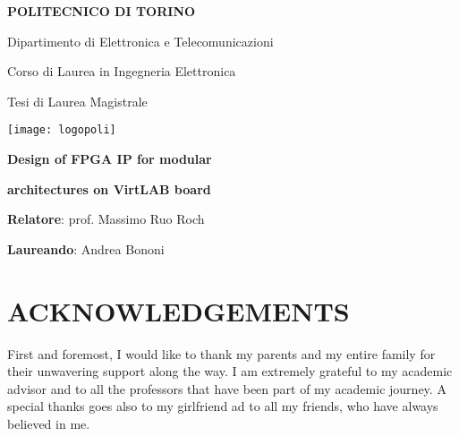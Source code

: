 \documentclass[10pt, english, a4paper, titlepage, oneside]{book}
\begin{document}
 

\begin{titlepage}
    \centerline{ \Huge\bf POLITECNICO DI TORINO }
    \vspace{2cm}
    \centerline{ \large Dipartimento di Elettronica e Telecomunicazioni } 
    \vspace{5mm}
    \centerline{ \large Corso di Laurea in Ingegneria Elettronica }
    \vspace{5mm}
    \centerline{ \large Tesi di Laurea Magistrale }
    \vspace{3cm}
    \centerline{ \texttt{[image: logopoli]} }
    \vspace{3cm}
    \centerline{ \Huge\bf Design of FPGA IP for modular }
    \vspace{5mm}
    \centerline{ \Huge\bf architectures on VirtLAB board }
    \vspace{4cm}
    \centerline{ \large \textbf{Relatore}: prof. Massimo Ruo Roch }
    \vspace{5mm}
    \centerline{ \large \textbf{Laureando}: Andrea Bononi }
\end{titlepage}

\chapter*{ACKNOWLEDGEMENTS}
\noindent First and foremost, I would like to thank my parents and my entire family for their unwavering support along the way. I am extremely grateful to my academic advisor and to all the professors that have been part of my academic journey. A special thanks goes also to my girlfriend ad to all my friends, who have always believed in me.

\tableofcontents

\printglossary[type=\acronymtype, nonumberlist]

\end{document}
